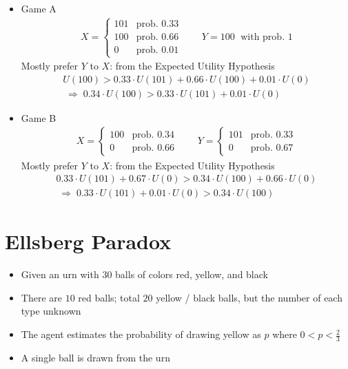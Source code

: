 \documentclass[10pt]{beamer}
\newcommand{\ie}{\;\Longrightarrow\;}
\begin{document}
\begin{frame}
  \begin{itemize}[<+->]\setlength\itemsep{0em}
    \item Game A
      \begin{align*}
        X = \begin{cases}101 & \text{prob. } 0.33\\100 & \text{prob. } 0.66\\ 0 & \text{prob. } 0.01 \end{cases} \qquad
        Y = 100 \;\text{ with prob. } 1
      \end{align*}
      \onslide<+->
      Mostly prefer $Y$ to $X$: from the Expected Utility Hypothesis 
      \onslide<+->
      \begin{multline}
        U(100) > 0.33\cdot U(101) + 0.66\cdot U(100) + 0.01\cdot U(0)\\ \ie 0.34\cdot U(100) > 0.33\cdot U(101) + 0.01\cdot U(0)
      \end{multline}
    \item Game B 
      \begin{align*}
        X = \begin{cases}100 & \text{prob. } 0.34\\ 0 & \text{prob. } 0.66 \end{cases} \qquad
        Y = \begin{cases}101 & \text{prob. } 0.33\\ 0 & \text{prob. } 0.67 \end{cases}
      \end{align*}
      \onslide<+->
      Mostly prefer $Y$ to $X$: from the Expected Utility Hypothesis 
      \onslide<+->
      \begin{multline}
        0.33\cdot U(101) + 0.67\cdot U(0) > 0.34\cdot U(100) + 0.66\cdot U(0)\\ \ie 0.33\cdot U(101) + 0.01\cdot U(0) > 0.34\cdot U(100)
      \end{multline}
  \end{itemize}
\end{frame}

\section{Ellsberg Paradox}

\begin{frame}
  \begin{itemize}[<+->]
    \item Given an urn with $30$ balls of colors red, yellow, and black
    \item There are $10$ red balls; total $20$ yellow / black balls, but the number of each type unknown
    \item The agent estimates the probability of drawing yellow as $p$ where $0 < p < \frac{2}{3}$
    \item A single ball is drawn from the urn
  \end{itemize}
\end{frame}
\end{document}
